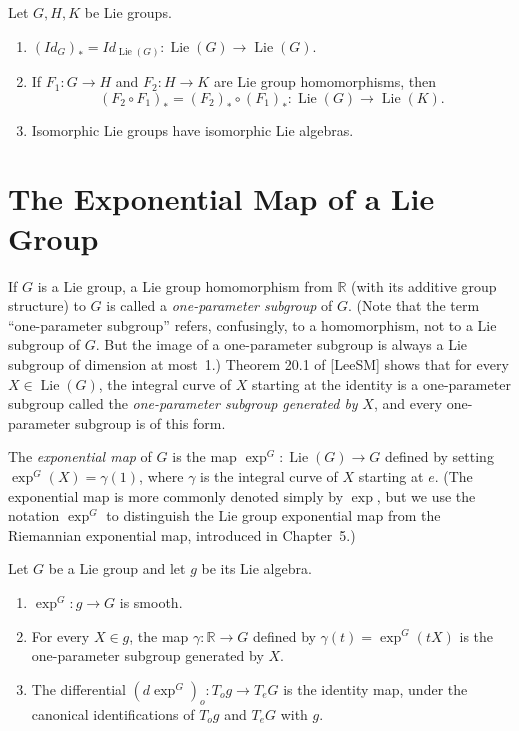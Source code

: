 \begin{proposition}
\label{prop:properties-of-induced-homomorphisms}


Let $G, H, K$ be Lie groups.

\begin{enumerate}
\item[$(a)$] $(Id_G)_* = Id_{\operatorname{Lie}(G)} : \operatorname{Lie}(G) \to \operatorname{Lie}(G)$.
\item[$(b)$] If $F_1 : G \to H$ and $F_2 : H \to K$ are Lie group homomorphisms, then
\[
(F_2 \circ F_1)_* = (F_2)_* \circ (F_1)_* : \operatorname{Lie}(G) \to \operatorname{Lie}(K).
\]
\item[$(c)$] Isomorphic Lie groups have isomorphic Lie algebras.
\end{enumerate}
\end{proposition}

\section{The Exponential Map of a Lie Group}

If $G$ is a Lie group, a Lie group homomorphism from $\mathbb{R}$ (with its additive group structure) to $G$ is called a \emph{one-parameter subgroup} of $G$. (Note that the term ``one-parameter subgroup'' refers, confusingly, to a homomorphism, not to a Lie subgroup of $G$. But the image of a one-parameter subgroup is always a Lie subgroup of dimension at most~1.) Theorem 20.1 of [LeeSM] shows that for every $X \in \operatorname{Lie}(G)$, the integral curve of $X$ starting at the identity is a one-parameter subgroup called the \emph{one-parameter subgroup generated by} $X$, and every one-parameter subgroup is of this form.

The \emph{exponential map} of $G$ is the map $\exp^G : \operatorname{Lie}(G) \to G$ defined by setting $\exp^G(X) = \gamma(1)$, where $\gamma$ is the integral curve of $X$ starting at $e$. (The exponential map is more commonly denoted simply by $\exp$, but we use the notation $\exp^G$ to distinguish the Lie group exponential map from the Riemannian exponential map, introduced in Chapter~5.)

\begin{proposition}
\label{prop:properties-of-lie-group-exponential-map}

Let $G$ be a Lie group and let $g$ be its Lie algebra.

\begin{enumerate}
\item[$(a)$] $\exp^G : g \to G$ is smooth.
\item[$(b)$] For every $X \in g$, the map $\gamma : \mathbb{R} \to G$ defined by $\gamma(t) = \exp^G(tX)$ is the one-parameter subgroup generated by $X$.
\item[$(c)$] The differential $(d\exp^G)_o : T_o g \to T_e G$ is the identity map, under the canonical identifications of $T_o g$ and $T_e G$ with $g$.
\end{enumerate}
\end{proposition}


